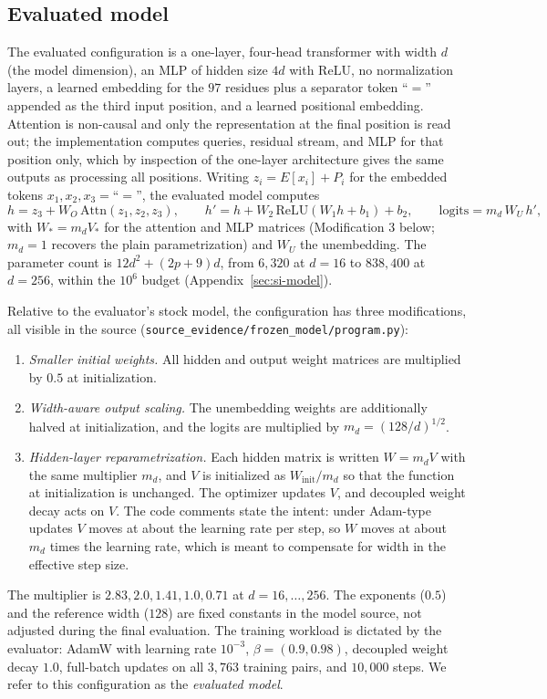 \documentclass{article}
\begin{document}
\subsection{Evaluated model}
\label{sec:model}
The evaluated configuration is a one-layer, four-head transformer with width $d$ (the model dimension), an MLP of hidden size $4d$ with ReLU, no normalization layers, a learned embedding for the $97$ residues plus a separator token ``$=$'' appended as the third input position, and a learned positional embedding. Attention is non-causal and only the representation at the final position is read out; the implementation computes queries, residual stream, and MLP for that position only, which by inspection of the one-layer architecture gives the same outputs as processing all positions. Writing $z_i=E[x_i]+P_i$ for the embedded tokens $x_1,x_2,x_3{=}$``$=$'', the evaluated model computes
\begin{equation}
h=z_3+W_O\,\mathrm{Attn}(z_1,z_2,z_3),\qquad h'=h+W_2\,\mathrm{ReLU}(W_1h+b_1)+b_2,\qquad \text{logits}=m_d\,W_U\,h',
\end{equation}
with $W_\ast=m_dV_\ast$ for the attention and MLP matrices (Modification 3 below; $m_d=1$ recovers the plain parametrization) and $W_U$ the unembedding. The parameter count is $12d^2+(2p+9)d$, from $6{,}320$ at $d=16$ to $838{,}400$ at $d=256$, within the $10^6$ budget (Appendix~\ref{sec:si-model}).

Relative to the evaluator's stock model, the configuration has three modifications, all visible in the source (\texttt{source\_evidence/frozen\_model/program.py}):
\begin{enumerate}
\item \emph{Smaller initial weights.} All hidden and output weight matrices are multiplied by $0.5$ at initialization.
\item \emph{Width-aware output scaling.} The unembedding weights are additionally halved at initialization, and the logits are multiplied by $m_d=(128/d)^{1/2}$.
\item \emph{Hidden-layer reparametrization.} Each hidden matrix is written $W=m_d V$ with the same multiplier $m_d$, and $V$ is initialized as $W_{\mathrm{init}}/m_d$ so that the function at initialization is unchanged. The optimizer updates $V$, and decoupled weight decay acts on $V$. The code comments state the intent: under Adam-type updates $V$ moves at about the learning rate per step, so $W$ moves at about $m_d$ times the learning rate, which is meant to compensate for width in the effective step size.
\end{enumerate}
The multiplier is $2.83, 2.0, 1.41, 1.0, 0.71$ at $d=16,\dots,256$. The exponents ($0.5$) and the reference width ($128$) are fixed constants in the model source, not adjusted during the final evaluation. The training workload is dictated by the evaluator: AdamW with learning rate $10^{-3}$, $\beta=(0.9,0.98)$, decoupled weight decay $1.0$, full-batch updates on all $3{,}763$ training pairs, and $10{,}000$ steps. We refer to this configuration as the \emph{evaluated model}.
\end{document}
